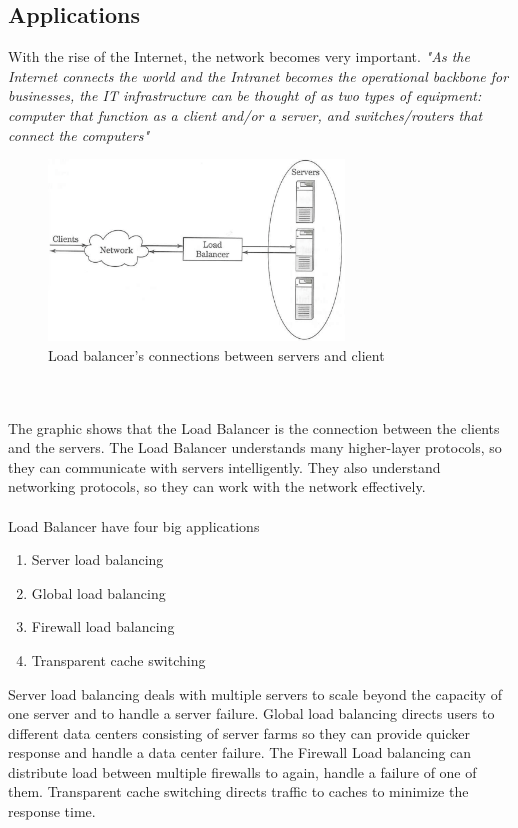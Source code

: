 \documentclass[12p]{article}
\begin{document}
	\subsection{Applications}
	With the rise of the Internet, the network becomes very important. \textit{"As the Internet connects the world and the Intranet becomes the operational backbone for businesses, the IT infrastructure can be thought of as two types of equipment: computer that function as a client and/or a server, and switches/routers that connect the computers"} \cite{lb_SFC}\\
	\begin{figure}[h!]
		\centering
		\includegraphics[width=0.7\textwidth]{img/basic.png}
		\caption{Load balancer's connections between servers and client\cite{lb_SFC}}
	\end{figure}\\\\
	The graphic shows that the Load Balancer is the connection between the clients and the servers. The Load Balancer understands many higher-layer protocols, so they can communicate with servers intelligently. They also understand networking protocols, so they can work with the network effectively.\\\\
	Load Balancer have four big applications
	\begin{enumerate}
		\item Server load balancing
		\item Global load balancing
		\item Firewall load balancing
		\item Transparent cache switching
	\end{enumerate}
	Server load balancing deals with multiple servers to scale beyond the capacity of one server and to handle a server failure. Global load balancing directs users to different data centers consisting of server farms so they can provide quicker response and handle a data center failure. The Firewall Load balancing can distribute load between multiple firewalls to again, handle a failure of one of them. Transparent cache switching directs traffic to caches to minimize the response time. \\ \\
\end{document}
